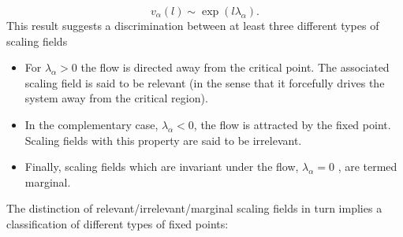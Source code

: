 \[v_{\alpha}(l) \sim \exp(l\lambda_{\alpha}).\]
This result suggests a discrimination between at least three different types of scaling fields
\begin{itemize}
\item For $\lambda_{\alpha} > 0$ the flow is directed away from the critical point. The associated scaling field
is said to be relevant (in the sense that it forcefully drives the system away from the critical region).
\item In the complementary case, $\lambda_{\alpha} < 0$, the flow is attracted by the fixed point. Scaling fields
with this property are said to be irrelevant.
\item Finally, scaling fields which are invariant under the flow, $\lambda_{\alpha} = 0$ , are termed marginal.
\end{itemize}
The distinction of relevant/irrelevant/marginal scaling fields in turn implies a classification of different types of fixed points:
